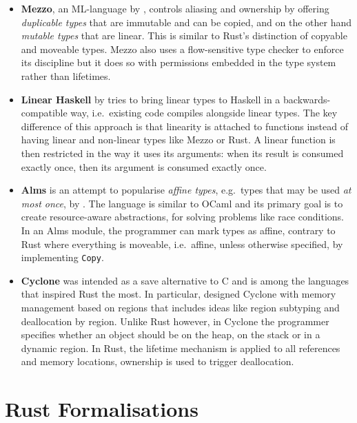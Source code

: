 \begin{itemize}
\item
  \textbf{Mezzo}, an ML-language by \citet{mezzo}, controls aliasing
  and ownership by offering \emph{duplicable types} that are immutable
  and can be copied, and on the other hand \emph{mutable types} that are
  linear. This is similar to Rust's distinction of copyable and moveable
  types. Mezzo also uses a flow-sensitive type checker to enforce its
  discipline but it does so with permissions embedded in the type system
  rather than lifetimes.

\item \textbf{Linear Haskell} by \citet{linear-haskell} tries to bring linear
types to Haskell in a backwards-compatible way, i.e.~existing code compiles
alongside linear types. The key difference of this approach is that linearity is
attached to functions instead of having linear and non-linear types like Mezzo
or Rust. A linear function is then restricted in the way it uses its arguments:
when its result is consumed exactly once, then its argument is consumed exactly
once.

\item
  \textbf{Alms} is an attempt to popularise \emph{affine types},
  e.g.~types that may be used \emph{at most once}, by \citet{alms}. The
  language is similar to OCaml and its primary goal is to create
  resource-aware abstractions, for solving problems like race
  conditions. In an Alms module, the programmer can mark types as
  affine, contrary to Rust where everything is moveable, i.e.~affine,
  unless otherwise specified, by implementing
  \passthrough{\lstinline!Copy!}.

\item
  \textbf{Cyclone} was intended as a save alternative to C and is among
  the languages that inspired Rust the most. In particular,
  \citet{cyclone-region} designed Cyclone with memory management based
  on regions that includes ideas like region subtyping and deallocation
  by region. Unlike Rust however, in Cyclone the programmer specifies
  whether an object should be on the heap, on the stack or in a dynamic
  region. In Rust, the lifetime mechanism is applied to all references
  and memory locations, ownership is used to trigger deallocation.
\end{itemize}


\section{Rust Formalisations}

